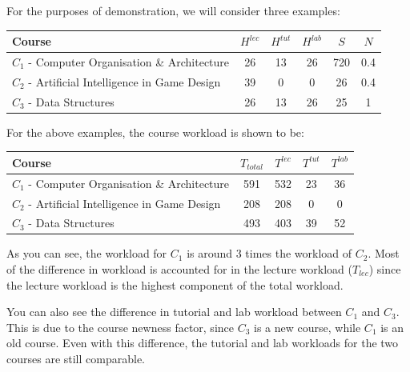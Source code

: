For the purposes of demonstration, we will consider three examples:

\begin{table}[ht]
  \centering
  \begin{tabular}{|l|c|c|c|c|c|}
    \hline
    \textbf{Course}                                  & \(H^{lec}\) & \(H^{tut}\) & \(H^{lab}\) & \(S\) & \(N\) \\\hline
    \(C_1\) - Computer Organisation \& Architecture  & 26          & 13          & 26          & 720   & 0.4   \\\hline
    \(C_2\) - Artificial Intelligence in Game Design & 39          & 0           & 0           & 26    & 0.4   \\\hline
    \(C_3\) - Data Structures                        & 26          & 13          & 26          & 25    & 1     \\\hline
  \end{tabular}
\end{table}

For the above examples, the course workload is shown to be:

\begin{table}[ht]
  \centering
  \begin{tabular}{|l|c|c|c|c|}
    \hline
    \textbf{Course}                                  & \(T_{total}\) & \(T^{lec}\) & \(T^{tut}\) & \(T^{lab}\) \\\hline
    \(C_1\) - Computer Organisation \& Architecture  & 591           & 532         & 23          & 36          \\\hline
    \(C_2\) - Artificial Intelligence in Game Design & 208           & 208         & 0           & 0           \\\hline
    \(C_3\) - Data Structures                        & 493           & 403         & 39          & 52          \\\hline
  \end{tabular}
\end{table}

As you can see, the workload for \(C_1\) is around 3 times the workload of \(C_2\). Most of the difference in workload is accounted for in the lecture workload (\(T_{lec}\)) since the lecture workload is the highest component of the total workload.

You can also see the difference in tutorial and lab workload between \(C_1\) and \(C_3\). This is due to the course newness factor, since \(C_3\) is a new course, while \(C_1\) is an old course. Even with this difference, the tutorial and lab workloads for the two courses are still comparable.

